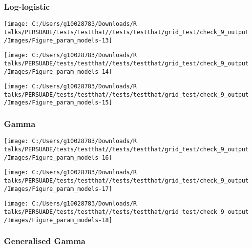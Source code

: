 \documentclass[
]{article}
\begin{document}
\subsubsection{Log-logistic}\label{log-logistic}

\begin{flushleft}\texttt{[image: C:/Users/g10028783/Downloads/R talks/PERSUADE/tests/testthat//tests/testthat/grid\_test/check\_9\_output/Images/Figure\_param\_models-13]} \end{flushleft}

\begin{flushleft}\texttt{[image: C:/Users/g10028783/Downloads/R talks/PERSUADE/tests/testthat//tests/testthat/grid\_test/check\_9\_output/Images/Figure\_param\_models-14]} \end{flushleft}

\begin{flushleft}\texttt{[image: C:/Users/g10028783/Downloads/R talks/PERSUADE/tests/testthat//tests/testthat/grid\_test/check\_9\_output/Images/Figure\_param\_models-15]} \end{flushleft}

\clearpage

\subsubsection{Gamma}\label{gamma}

\begin{flushleft}\texttt{[image: C:/Users/g10028783/Downloads/R talks/PERSUADE/tests/testthat//tests/testthat/grid\_test/check\_9\_output/Images/Figure\_param\_models-16]} \end{flushleft}

\begin{flushleft}\texttt{[image: C:/Users/g10028783/Downloads/R talks/PERSUADE/tests/testthat//tests/testthat/grid\_test/check\_9\_output/Images/Figure\_param\_models-17]} \end{flushleft}

\begin{flushleft}\texttt{[image: C:/Users/g10028783/Downloads/R talks/PERSUADE/tests/testthat//tests/testthat/grid\_test/check\_9\_output/Images/Figure\_param\_models-18]} \end{flushleft}

\clearpage

\subsubsection{Generalised Gamma}\label{generalised-gamma}
\end{document}
